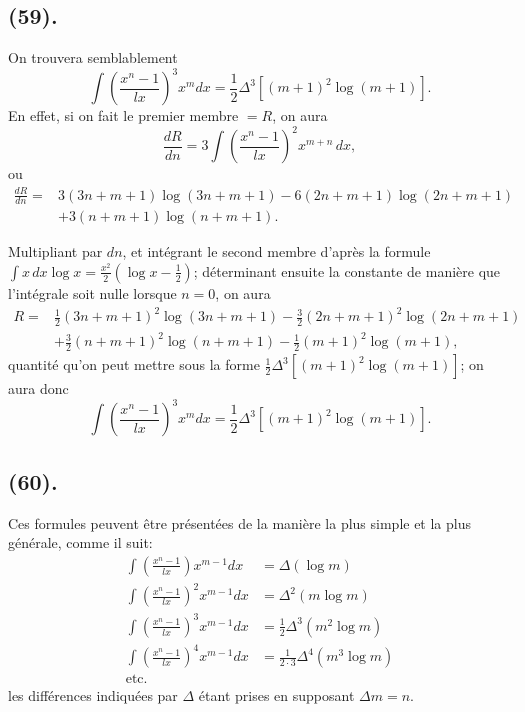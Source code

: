 \documentclass{article}
\begin{document}
\subsection*{(59).}

On trouvera semblablement
\[ \int\left(\frac{x^{n}-1}{lx}\right)^{3}x^{m}dx=\frac{1}{2}\Delta^{3}[(m+1)^{2}\log(m+1)]. \]
En effet, si on fait le premier membre $=R$, on aura
\[ \frac{dR}{dn}=3\int\left(\frac{x^{n}-1}{lx}\right)^{2}x^{m+n}\,dx, \]
ou
\[ \begin{aligned} \frac{dR}{dn}={}&3(3n+m+1)\log(3n+m+1)-6(2n+m+1)\log(2n+m+1)\\ &+3(n+m+1)\log(n+m+1). \end{aligned} \]

Multipliant par $dn$, et intégrant le second membre d'après la formule $\displaystyle\int x\,dx\log x=\frac{x^{2}}{2}(\log x-\tfrac{1}{2})$; déterminant ensuite la constante de manière que l'intégrale soit nulle lorsque $n=0$, on aura
\[ \begin{aligned} R={}&\tfrac{1}{2}(3n+m+1)^{2}\log(3n+m+1)-\tfrac{3}{2}(2n+m+1)^{2}\log(2n+m+1)\\ &+\tfrac{3}{2}(n+m+1)^{2}\log(n+m+1)-\tfrac{1}{2}(m+1)^{2}\log(m+1), \end{aligned} \]
quantité qu'on peut mettre sous la forme $\frac{1}{2}\Delta^{3}[(m+1)^{2}\log(m+1)]$; on aura donc
\[ \int\left(\frac{x^{n}-1}{lx}\right)^{3}x^{m}dx=\frac{1}{2}\Delta^{3}[(m+1)^{2}\log(m+1)]. \tag{5} \]

\subsection*{(60).}

Ces formules peuvent être présentées de la manière la plus simple et la plus générale, comme il suit:
\[ \begin{aligned} \int\left(\frac{x^{n}-1}{lx}\right)x^{m-1}dx&=\Delta(\log m)\\ \int\left(\frac{x^{n}-1}{lx}\right)^{2}x^{m-1}dx&=\Delta^{2}(m\log m)\\ \int\left(\frac{x^{n}-1}{lx}\right)^{3}x^{m-1}dx&=\frac{1}{2}\Delta^{3}(m^{2}\log m)\\ \int\left(\frac{x^{n}-1}{lx}\right)^{4}x^{m-1}dx&=\frac{1}{2\cdot3}\Delta^{4}(m^{3}\log m)\\ \text{etc.}\qquad& \end{aligned} \]
les différences indiquées par $\Delta$ étant prises en supposant $\Delta m=n$.
\end{document}
